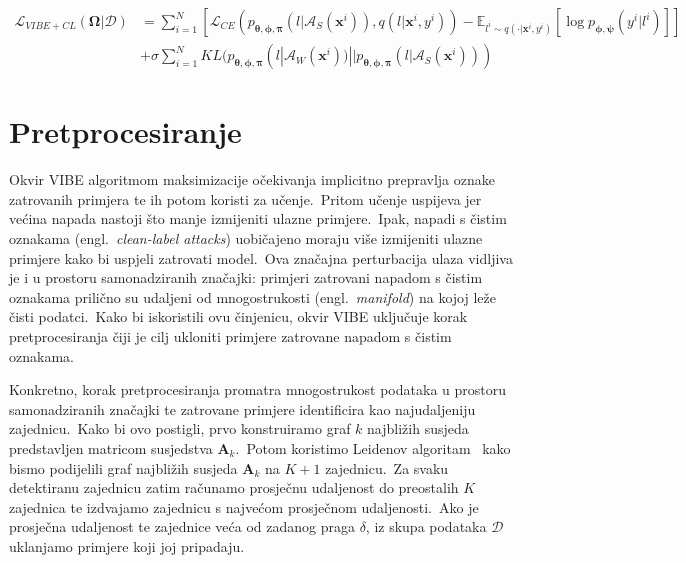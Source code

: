 \documentclass[diplomskirad]{fer}
\begin{document}
\begin{equation}
  \begin{aligned}
    \mathcal{L}_{VIBE + CL}(\bm{\Omega} | \mathcal{D}) &= \sum_{i=1}^{N} \left[ \mathcal{L}_{CE} (p_{\bm{\theta}, \bm{\phi}, \bm{\pi}}(l | \mathcal{A}_{S}(\bm{x}^i)), q(l | \bm{x}^i, y^i)) - \mathbb{E}_{l^i \sim q(\cdot | \bm{x}^i, y^i)} \left[ \log p_{\bm{\phi}, \bm{\psi}}(y^i | l^i) \right] \right] \\
                                                       &+ \sigma \sum_{i=1}^{N} KL(p_{\bm{\theta}, \bm{\phi}, \bm{\pi}}(l | \mathcal{A}_{W}(\bm{x}^i)) || p_{\bm{\theta}, \bm{\phi}, \bm{\pi}}(l | \mathcal{A}_{S}(\bm{x}^i)))
  \end{aligned}
  \label{eq:vibe_with_con_loss}
\end{equation}

\section{Pretprocesiranje}
\label{sek:preproc}

Okvir VIBE algoritmom maksimizacije očekivanja implicitno prepravlja oznake zatrovanih primjera te ih potom koristi za učenje.\ 
Pritom učenje uspijeva jer većina napada nastoji što manje izmijeniti ulazne primjere.\ 
Ipak, napadi s čistim oznakama (engl.\ \textit{clean-label attacks}) uobičajeno moraju više izmijeniti ulazne primjere kako bi uspjeli zatrovati model.\ 
Ova značajna perturbacija ulaza vidljiva je i u prostoru samonadziranih značajki: primjeri zatrovani napadom s čistim oznakama prilično su udaljeni od mnogostrukosti (engl.\ \textit{manifold}) na kojoj leže čisti podatci.\ 
Kako bi iskoristili ovu činjenicu, okvir VIBE uključuje korak pretprocesiranja čiji je cilj ukloniti primjere zatrovane napadom s čistim oznakama.\ 

Konkretno, korak pretprocesiranja promatra mnogostrukost podataka u prostoru samonadziranih značajki te zatrovane primjere identificira kao najudaljeniju zajednicu.\ 
Kako bi ovo postigli, prvo konstruiramo graf $k$ najbližih susjeda predstavljen matricom susjedstva $\bm{A}_k$.\ 
Potom koristimo Leidenov algoritam~\cite{traag2019louvain} kako bismo podijelili graf najbližih susjeda $\bm{A}_k$ na $K + 1$ zajednicu.\ 
Za svaku detektiranu zajednicu zatim računamo prosječnu udaljenost do preostalih $K$ zajednica te izdvajamo zajednicu s najvećom prosječnom udaljenosti.\ 
Ako je prosječna udaljenost te zajednice veća od zadanog praga $\delta$, iz skupa podataka $\mathcal{D}$ uklanjamo primjere koji joj pripadaju.\ 
\end{document}
